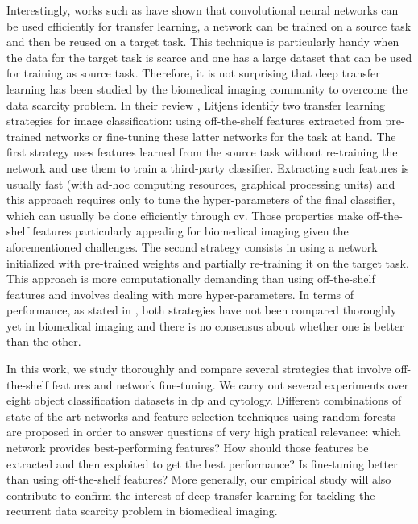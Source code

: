 Interestingly, works such as \parencite{donahue2014decaf,yosinski2014transferable,sermanet2013overfeat} have shown that convolutional neural networks can be used efficiently for transfer learning, \ie a network can be trained on a source task and then be reused on a target task. This technique is particularly handy when the data for the target task is scarce and one has a large dataset that can be used for training as source task. Therefore, it is not surprising that deep transfer learning has been studied by the biomedical imaging community to overcome the data scarcity problem. In their review \parencite{litjens2017survey}, Litjens \etal identify two transfer learning strategies for image classification: using off-the-shelf features extracted from pre-trained networks or fine-tuning these latter networks for the task at hand. The first strategy uses features learned from the source task without re-training the network and use them to train a third-party classifier. Extracting such features is usually fast (with ad-hoc computing resources, \ie graphical processing units) and this approach requires only to tune the hyper-parameters of the final classifier, which can usually be done efficiently through \acrlong{cv}. Those properties make off-the-shelf features particularly appealing for biomedical imaging given the aforementioned challenges. The second strategy consists in using a network initialized with pre-trained weights and partially re-training it on the target task. This approach is more computationally demanding than using off-the-shelf features and involves dealing with more hyper-parameters. In terms of performance, as stated in \parencite{litjens2017survey}, both strategies have not been compared thoroughly yet in biomedical imaging and there is no consensus about whether one is better than the other.

In this work, we study thoroughly and compare several strategies that involve off-the-shelf features and network fine-tuning. We carry out several experiments over eight object classification datasets in \acrshort{dp} and cytology. Different combinations of state-of-the-art networks and feature selection techniques using random forests are proposed in order to answer questions of very high pratical relevance: which network provides best-performing features? How should those features be extracted and then exploited to get the best performance? Is fine-tuning better than using off-the-shelf features? More generally, our empirical study will also contribute to confirm the interest of deep transfer learning for tackling the recurrent data scarcity problem in biomedical imaging.





